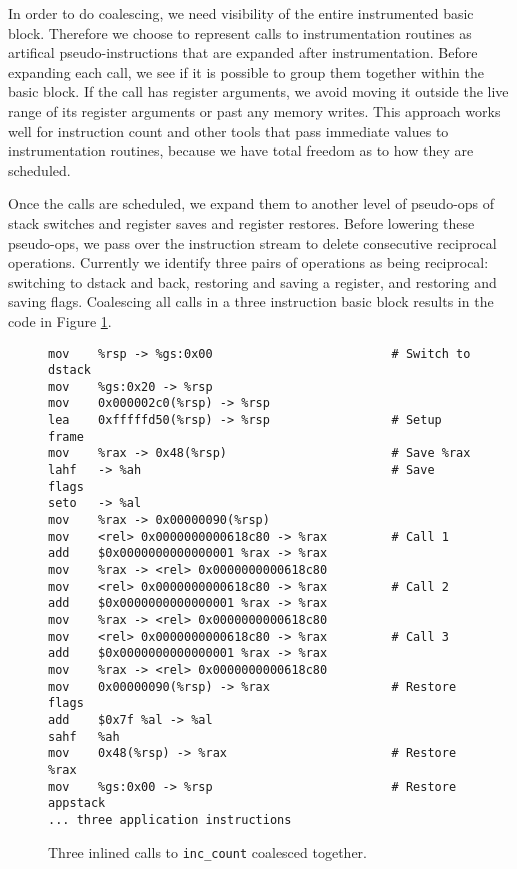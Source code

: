 In order to do coalescing, we need visibility of the entire instrumented basic
block.  Therefore we choose to represent calls to instrumentation routines as
artifical pseudo-instructions that are expanded after instrumentation.  Before
expanding each call, we see if it is possible to group them together within the
basic block.  If the call has register arguments, we avoid moving it outside
the live range of its register arguments or past any memory writes.  This
approach works well for instruction count and other tools that pass immediate
values to instrumentation routines, because we have total freedom as to how
they are scheduled.

Once the calls are scheduled, we expand them to another level of pseudo-ops of
stack switches and register saves and register restores.  Before lowering these
pseudo-ops, we pass over the instruction stream to delete consecutive
reciprocal operations.  Currently we identify three pairs of operations as
being reciprocal: switching to dstack and back, restoring and saving a
register, and restoring and saving flags.  Coalescing all calls in a three
instruction basic block results in the code in Figure
\ref{fig:inscount_coalesced}.

\begin{figure}
\begin{verbatim}
mov    %rsp -> %gs:0x00                         # Switch to dstack
mov    %gs:0x20 -> %rsp 
mov    0x000002c0(%rsp) -> %rsp 
lea    0xfffffd50(%rsp) -> %rsp                 # Setup frame
mov    %rax -> 0x48(%rsp)                       # Save %rax
lahf   -> %ah                                   # Save flags
seto   -> %al 
mov    %rax -> 0x00000090(%rsp) 
mov    <rel> 0x0000000000618c80 -> %rax         # Call 1
add    $0x0000000000000001 %rax -> %rax 
mov    %rax -> <rel> 0x0000000000618c80 
mov    <rel> 0x0000000000618c80 -> %rax         # Call 2
add    $0x0000000000000001 %rax -> %rax 
mov    %rax -> <rel> 0x0000000000618c80 
mov    <rel> 0x0000000000618c80 -> %rax         # Call 3
add    $0x0000000000000001 %rax -> %rax 
mov    %rax -> <rel> 0x0000000000618c80 
mov    0x00000090(%rsp) -> %rax                 # Restore flags
add    $0x7f %al -> %al 
sahf   %ah 
mov    0x48(%rsp) -> %rax                       # Restore %rax
mov    %gs:0x00 -> %rsp                         # Restore appstack
... three application instructions
\end{verbatim}
\caption{Three inlined calls to {\tt inc\_count} coalesced together.}
\label{fig:inscount_coalesced}
\end{figure}

